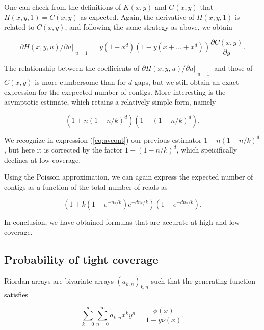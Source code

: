 \documentclass{article}
\begin{document}
One can check from the definitions of $K(x,y)$ and $G(x,y)$ that $H(x,y,1)
= C(x,y)$ as expected. Again, the derivative of $H(x,y,1)$ is related to
$C(x,y)$, and following the same strategy as above, we obtain

\begin{equation*}
\partial H(x,y,u)/\partial u|_{\substack{\\u=1}}
= y(1-x^d)\left( 1 - y(x+\ldots+x^d) \right)
\frac{\partial C(x,y)}{\partial y}.
\end{equation*}

The relationship between the coefficients of $\partial H(x,y,u) /\partial
u|_{\substack{\\u=1}}$ and those of $C(x,y)$ is more cumbersome than for
$d$-gaps, but we still obtain an exact expression for the exepected number
of contigs. More interesting is the asymptotic estimate, which retains a
relatively simple form, namely

\begin{equation}
\label{eq:avcont}
\left( 1+n(1-n/k)^d \right) \left(1-(1-n/k)^d\right).
\end{equation}

We recognize in expression (\ref{eq:avcont}) our previous estimator
$1+n(1-n/k)^d$, but here it is corrected by the factor $1-(1-n/k)^d$,
which speicifically declines at low coverage.

Using the Poisson approximation, we can again express the expected number
of contigs as a function of the total number of reads as

\begin{equation}
\label{eq:avcontnstar}
(1 + k(1-e^{-n_*/k})e^{-dn_*/k} ) (1-e^{-dn_*/k}).
\end{equation}

In conclusion, we have obtained formulas that are accurate at high and low
coverage.




\subsection{Probability of tight coverage}
\label{sec:compass}

Riordan arrays are bivariate arrays $(a_{k,n})_{k,n}$ such that the
generating function satisfies

\begin{equation*}
\sum_{k=0}^\infty \sum_{n=0}^\infty a_{k,n} x^k y^n =
\frac{\phi(x)}{1-y \nu(x)}.
\end{equation*}
\end{document}
